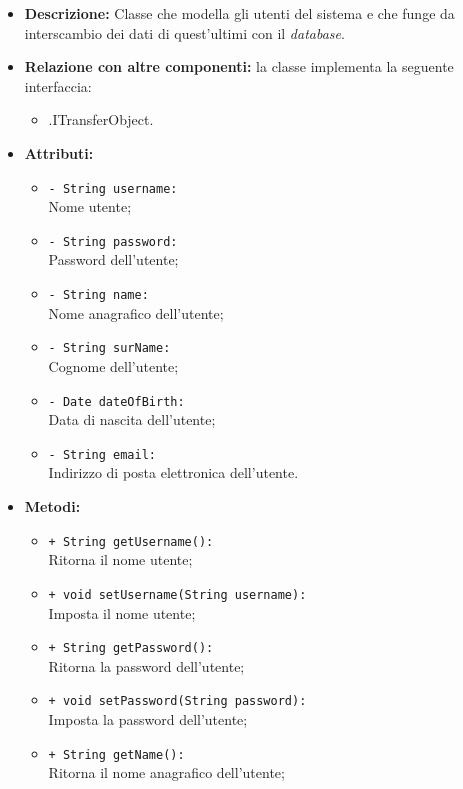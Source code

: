 \begin{flushleft}
\begin{itemize}
\item \textbf{Descrizione:} Classe che modella gli utenti del sistema e che funge da interscambio dei dati di quest'ultimi con il \textit{database}.
\item \textbf{Relazione con altre componenti:} la classe implementa la seguente interfaccia:
		\begin{itemize}
			\item \smodel{}.ITransferObject.
		\end{itemize}
\item \textbf{Attributi:}
\begin{sloppypar}
\begin{itemize}
\item \texttt{- String username:}\\ Nome utente;
\item \texttt{- String password:}\\ Password dell'utente;
\item \texttt{- String name:}\\Nome anagrafico dell'utente;
\item \texttt{- String surName:}\\Cognome dell'utente;
\item \texttt{- Date dateOfBirth:}\\Data di nascita dell'utente;
\item \texttt{- String email:}\\Indirizzo di posta elettronica dell'utente.
\end{itemize}
\end{sloppypar}
\item \textbf{Metodi:}
\begin{sloppypar}
\begin{itemize}
\item \texttt{+ String getUsername():}\\ Ritorna il nome utente;
\item \texttt{+ void setUsername(String username):}\\ Imposta il nome utente;
\item \texttt{+ String getPassword():}\\ Ritorna la password dell'utente;
\item \texttt{+ void setPassword(String password):}\\ Imposta la password dell'utente;
\item \texttt{+ String getName():}\\ Ritorna il nome anagrafico dell'utente;

\end{itemize}
\end{sloppypar}
\end{itemize}
\end{flushleft}
